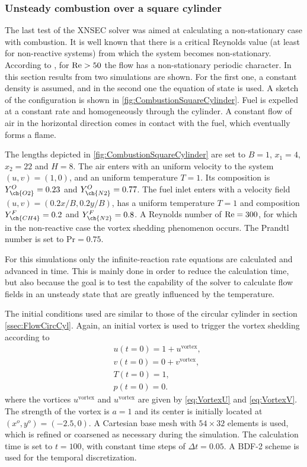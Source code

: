 \subsubsection{Unsteady combustion over a square cylinder}
The last test of the XNSEC solver was aimed at calculating a non-stationary case with combustion. It is well known that there is a critical Reynolds value (at least for non-reactive systems) from which the system becomes non-stationary. According to \cite{sharmaHEATFLUIDFLOW2004}, for $\text{Re} > 50$ the flow has a non-stationary periodic character. In this section results from two simulations are shown. For the first one, a constant density is assumed, and in the second one the equation of state is used. 
A sketch of the configuration is shown in \cref{fig:CombustionSquareCylinder}. Fuel is expelled at a constant rate and homogeneously through the cylinder. A constant flow of air in the horizontal direction comes in contact with the fuel, which eventually forms a flame.

The lengths depicted in \cref{fig:CombustionSquareCylinder} are set to $B = 1$, $x_1 = 4$, $x_2 = 22$ and $H = 8$. The air enters with an uniform velocity to the system $(u,v) =(1,0)$, and an uniform temperature $T = 1$. Its composition is $Y^O_{\ch{O2}} = 0.23$ and $Y^O_{\ch{N2}} = 0.77$. The fuel inlet enters with a velocity field $(u,v) = (0.2x/B,0.2y/B)$, has a uniform temperature $T = 1$ and composition $Y^F_{\ch{CH4}} = 0.2$ and $Y^F_{\ch{N2}} = 0.8$. A Reynolds number of $\text{Re} = 300$, for which in the non-reactive case the vortex shedding phenomenon occurs. The Prandtl number is set to $\text{Pr} = 0.75$. 

For this simulations only the infinite-reaction rate equations are calculated and advanced in time. This is mainly done in order to reduce the calculation time, but also because the goal is to test the capability of the solver to calculate flow fields in an unsteady state that are greatly influenced by the temperature.  

The initial conditions used are similar to those of the circular cylinder in section \cref{ssec:FlowCircCyl}. Again, an initial vortex is used to trigger the vortex shedding according to
\begin{subequations} 
	\begin{align}
		&u(t=0) = 1 + u^{\text{vortex}},  \\
		&v(t=0) = 0 + v^{\text{vortex}},  \\
		&T(t=0) = 1,\\
		&p(t=0) = 0.
	\end{align}
\end{subequations}
where the vortices $u^{\text{vortex}}$ and $u^{\text{vortex}}$ are given by \cref{eq:VortexU} and \cref{eq:VortexV}. The strength of the vortex is $a=1$ and its center is initially located at $(x^o,y^o) = (-2.5, 0)$. A Cartesian base mesh with $54\times32$ elements is used, which is refined or coarsened as necessary during the simulation. The calculation time is set to $t = 100$, with constant time steps of $\Delta t = 0.05$.  A BDF-2 scheme is used for the temporal discretization.


